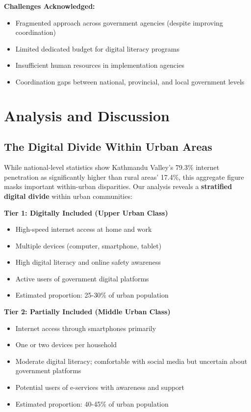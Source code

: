 \documentclass[12pt,a4paper]{article}
\begin{document}
\textbf{Challenges Acknowledged:}
\begin{itemize}
    \item Fragmented approach across government agencies (despite improving coordination)
    \item Limited dedicated budget for digital literacy programs
    \item Insufficient human resources in implementation agencies
    \item Coordination gaps between national, provincial, and local government levels
\end{itemize}

\newpage
\section{Analysis and Discussion}
\label{sec:analysis}

\subsection{The Digital Divide Within Urban Areas}

While national-level statistics show Kathmandu Valley's 79.3\% internet penetration as significantly higher than rural areas' 17.4\%, this aggregate figure masks important within-urban disparities. Our analysis reveals a \textbf{stratified digital divide} within urban communities:

\vspace{6pt}
\noindent\textbf{Tier 1: Digitally Included (Upper Urban Class)}
\begin{itemize}[leftmargin=1.5em]
    \item High-speed internet access at home and work
    \item Multiple devices (computer, smartphone, tablet)
    \item High digital literacy and online safety awareness
    \item Active users of government digital platforms
    \item Estimated proportion: 25-30\% of urban population
\end{itemize}

\vspace{6pt}
\noindent\textbf{Tier 2: Partially Included (Middle Urban Class)}
\begin{itemize}[leftmargin=1.5em]
    \item Internet access through smartphones primarily
    \item One or two devices per household
    \item Moderate digital literacy; comfortable with social media but uncertain about government platforms
    \item Potential users of e-services with awareness and support
    \item Estimated proportion: 40-45\% of urban population
\end{itemize}
\end{document}
